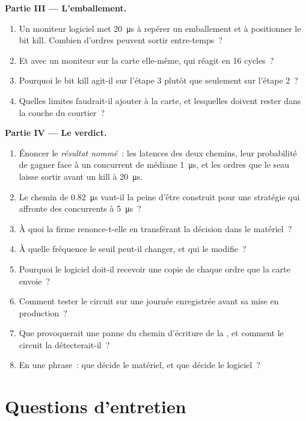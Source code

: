 \begin{problem}
\medskip\noindent\textbf{Partie III --- L'emballement.}
\begin{enumerate}[resume]
\item Un moniteur logiciel met \qty{20}{\micro\second} à repérer un emballement et à positionner le bit kill. Combien d'ordres peuvent sortir entre-temps~?
\item Et avec un moniteur sur la carte elle-même, qui réagit en 16 cycles~?
\item Pourquoi le bit kill agit-il sur l'étape 3 plutôt que seulement sur l'étape 2~?
\item Quelles limites faudrait-il ajouter à la carte, et lesquelles doivent rester dans la couche du courtier~?
\end{enumerate}

\medskip\noindent\textbf{Partie IV --- Le verdict.}
\begin{enumerate}[resume]
\item Énoncer le \emph{résultat nommé}~: les latences des deux chemins, leur probabilité de gagner face à un concurrent de médiane
  \qty{1}{\micro\second}, et les ordres que le seau laisse sortir avant un kill à \qty{20}{\micro\second}.
\item Le chemin de \qty{0.82}{\micro\second} vaut-il la peine d'être construit pour une stratégie qui affronte des concurrents à \qty{5}{\micro\second}~?
\item À quoi la firme renonce-t-elle en transférant la décision dans le matériel~?
\item À quelle fréquence le seuil peut-il changer, et qui le modifie~?
\item Pourquoi le logiciel doit-il recevoir une copie de chaque ordre que la carte envoie~?
\item Comment tester le circuit sur une journée enregistrée avant sa mise en production~?
\item Que provoquerait une panne du chemin d'écriture de la , et comment le circuit la détecterait-il~?
\item En une phrase~: que décide le matériel, et que décide le logiciel~?
\end{enumerate}
\end{problem}

\section{Questions d'entretien}

